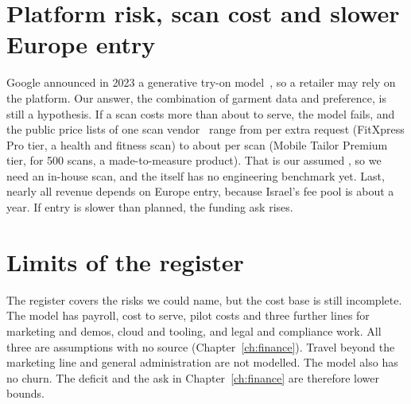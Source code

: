 \section{Platform risk, scan cost and slower Europe entry}\label{sec:platform-risk}
Google announced in 2023 a generative try-on model~\cite{google2023tryon}, so a retailer may rely on the platform. Our answer, the combination of garment data and preference, is still a hypothesis. If a scan costs more than about  to serve, the model fails, and the public price lists of one scan vendor~\cite{threedlook_pricing} range from  per extra request (FitXpress Pro tier, a health and fitness scan) to about  per scan (Mobile Tailor Premium tier,  for 500 scans, a made-to-measure product). That is  our assumed , so we need an in-house scan, and the  itself has no engineering benchmark yet. Last, nearly all revenue depends on Europe entry, because Israel's fee pool is about  a year. If entry is slower than planned, the funding ask rises.

\section{Limits of the register}\label{sec:limits}
The register covers the risks we could name, but the cost base is still incomplete. The model has payroll, cost to serve, pilot costs and three further lines for marketing and demos, cloud and tooling, and legal and compliance work. All three are assumptions with no source (Chapter~\ref{ch:finance}). Travel beyond the marketing line and general administration are not modelled. The model also has no churn. The deficit and the ask in Chapter~\ref{ch:finance} are therefore lower bounds.

\ctchapterend
